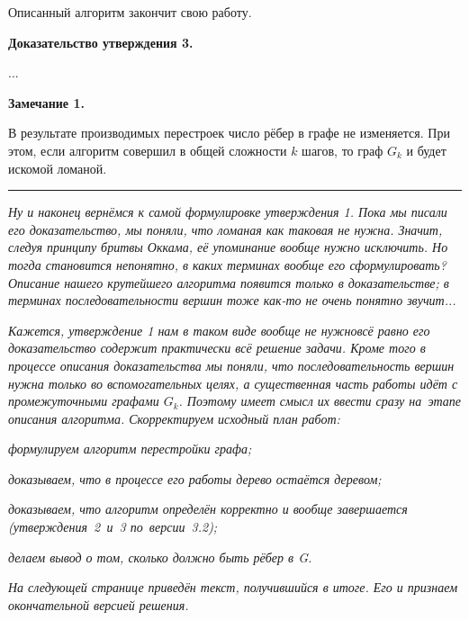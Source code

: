 \documentclass[a4paper,12pt]{article}
\begin{document}
Описанный алгоритм закончит свою работу.

{\bf Доказательство утверждения 3.}

\noindent
...

{\bf Замечание 1.}

В результате производимых перестроек число рёбер в графе не изменяется. При этом, если алгоритм совершил в общей сложности $k$ шагов, то граф $G_k$ и будет искомой ломаной.

\medskip
\hrule
\bigskip

\emph{
Ну и наконец вернёмся к самой формулировке утверждения 1. Пока мы писали его доказательство, мы поняли, что ломаная как таковая не нужна. Значит, следуя принципу бритвы Оккама, её упоминание вообще нужно исключить. Но тогда становится непонятно, в каких терминах вообще его сформулировать? Описание нашего крутейшего алгоритма появится только в доказательстве; в терминах последовательности вершин тоже как-то не очень понятно звучит...
}

\emph{
Кажется, утверждение 1 нам в таком виде вообще не нужно\т всё равно его доказательство содержит практически всё решение задачи. Кроме того в процессе описания доказательства мы поняли, что последовательность вершин нужна только во вспомогательных целях, а существенная часть работы идёт с промежуточными графами $G_k$. Поэтому имеет смысл их ввести сразу на~этапе описания алгоритма. Скорректируем исходный план работ:
}
\begin{items}{-3}
\item
\emph{формулируем алгоритм перестройки графа;}
\item
\emph{доказываем, что в процессе его работы дерево остаётся деревом;}
\item
\emph{доказываем, что алгоритм определён корректно и вообще завершается (утверждения~2~и~3 по~версии~3.2);}
\item
\emph{делаем вывод о том, сколько должно быть рёбер в G.}
\end{items}

\emph{
На следующей странице приведён текст, получившийся в итоге. Его и признаем окончательной версией решения.
}
\end{document}
